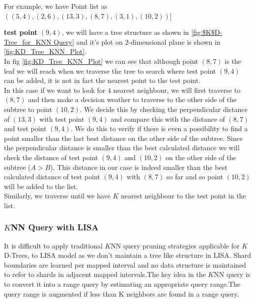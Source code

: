 \begin{mscexample}
	For example, we have Point list as\\ $((5,4),(2,6),(13,3),(8,7),(3,1),(10,2))]$ 
	
	\textbf{test point} $(9,4)$, we will have a tree structure as shown in \ref{fig:$K$D-Tree_for_KNN Query} and it's plot on $2$-dimensional plane is shown in \ref{fig:KD_Tree_KNN_Plot}. \\
	In fig \ref{fig:KD_Tree_KNN_Plot} we can see that although point $(8,7)$ is the leaf we will reach when we traverse the tree to search where test point $(9,4)$ can be added, it is not in fact the nearest point to the test point. \\
	In this case if we want to look for $4$ nearest neighbour, we will first traverse to $(8,7)$ and then make a decision weather to traverse to the other side of the subtree to point $(10,2)$. We decide this by checking the perpendicular distance of $(13,3)$ with test point $(9,4)$ and compare this with the distance of $(8,7)$ and test point $(9,4)$. We do this to verify if there is even a possibility to find a point smaller than the last best distance on the other side of the subtree. Since the perpendicular distance is smaller than the best calculated distance we will check the distance of test point $(9,4)$ and $(10,2)$ on the other side of the subtree ($A > B$). This distance in our case is indeed smaller than the best calculated distance of test point $(9,4)$ with $(8,7)$ so far and so point $(10,2)$ will be added to the list.\\
	Similarly, we traverse until we have $K$ nearest neighbour to the test point in the list.
\end{mscexample}



\subsubsection{$K$NN Query with LISA}
It is difficult to apply traditional $K$NN query pruning strategies applicable for $K$D-Trees, to LISA model as we don't maintain a tree like structure in LISA. Shard boundaries are learned per mapped interval and no data structure is maintained to refer to shards in adjacent mapped intervals.The key idea in the $K$NN query is to convert it into a range query by estimating an appropriate query range.The query range is augmented if less than K neighbors are found in a range query.

